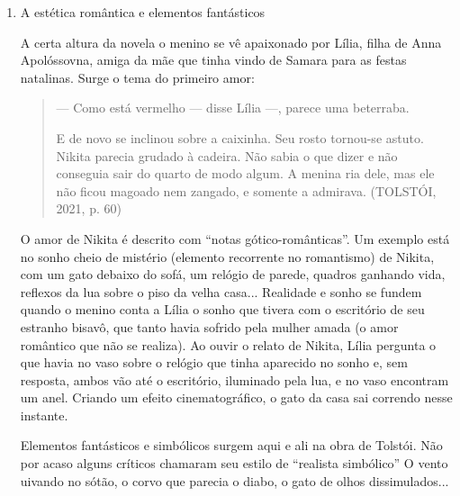 \documentclass{article}
\begin{document}
\begin{enumerate}
\item
A estética romântica e elementos fantásticos

A certa altura da novela o menino se vê apaixonado por Lília, filha de
Anna Apolóssovna, amiga da mãe que tinha vindo de Samara para as festas
natalinas. Surge o tema do primeiro amor:

\begin{quote}
--- Como está vermelho --- disse Lília ---, parece uma beterraba.

E de novo se inclinou sobre a caixinha. Seu rosto tornou-se astuto.
Nikita parecia grudado à cadeira. Não sabia o que dizer e não conseguia
sair do quarto de modo algum. A menina ria dele, mas ele não ficou
magoado nem zangado, e somente a admirava. (TOLSTÓI, 2021, p. 60)
\end{quote}

O amor de Nikita é descrito com ``notas gótico-românticas''. Um
exemplo está no sonho cheio de mistério (elemento recorrente no
romantismo) de Nikita, com um gato debaixo do sofá, um relógio de
parede, quadros ganhando vida, reflexos da lua sobre o piso da velha
casa... Realidade e sonho se fundem quando o menino conta a Lília o
sonho que tivera com o escritório de seu estranho bisavô, que tanto
havia sofrido pela mulher amada (o amor romântico que não se realiza).
Ao ouvir o relato de Nikita, Lília pergunta o que havia no vaso sobre o
relógio que tinha aparecido no sonho e, sem resposta, ambos vão até o
escritório, iluminado pela lua, e no vaso encontram um anel. Criando um
efeito cinematográfico, o gato da casa sai correndo nesse instante.

Elementos fantásticos e simbólicos surgem aqui e ali na obra de
Tolstói. Não por acaso alguns críticos chamaram seu estilo de ``realista
simbólico'' O vento uivando no sótão, o corvo que parecia o diabo, o
gato de olhos dissimulados...


\end{enumerate}
\end{document}
